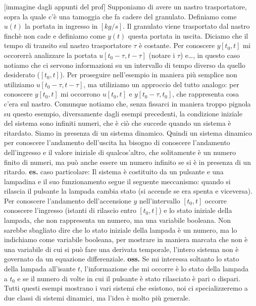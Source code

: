 [immagine dagli appunti del prof]\newline
Supponiamo di avere un nastro trasportatore, sopra la quale c'è una tamoggia che fa cadere del granulato. Definiamo come $u(t)$ la portata in ingresso in $[kg/s]$. Il granulato viene trasportato dal nastro finchè non cade e definiamo come $y(t)$ questa portata in uscita. Diciamo che il tempo di transito sul nastro trasportatore $\tau$ è costante.\newline
Per conoscere $y[t_0,t]$ mi occorerrà analizzare la portata $u[t_0-\tau,t-\tau]$ (notare i $\tau$) e\dots, in questo caso notiamo che ci servono informazioni su un intervallo di tempo diverso da quello desiderato ($[t_0,t]$). Per proseguire nell'esempio in maniera più semplice non utiliziamo $u[t_0-\tau,t-\tau]$, ma utiliziamo un approccio del tutto analogo: per conoscere $y[t_0,t]$ mi occorrono $u[t_0,t]$ e $y[t_0-\tau,t_0]$, che rappresenta cosa c'era sul nastro. Comunque notiamo che, senza fissarci in maniera troppo pignola su questo esempio, diversamente dagli esempi precedenti, la condizione iniziale del sistema sono infiniti numeri, che è ciò che succede quando un sistema è ritardato.\newline
Siamo in presenza di un sistema dinamico.\newline
\newline
Quindi un sistema dinamico per conoscere l'andamento dell'uscita ha bisogno di conoscere l'andamento dell'ingresso e il valore iniziale di qualcos'altro, che solitamente è un numero finito di numeri, ma può anche essere un numero infinito se si è in presenza di un ritardo.\newline
\newline
\textbf{es.} caso particolare:\newline
Il sistema è costituito da un pulsante e una lampadina e il suo funzionamento segue il seguente meccanismo: quando si rilascia il pulsante la lampada cambia stato (si accende se era spenta e viceversa).\newline
Per conoscere l'andamento dell'accensione $y$ nell'intervallo $[t_0,t]$ occorre conoscere l'ingresso (istanti di rilascio entro $[t_0,t]$) e lo stato iniziale della lampada, che non rappresenta un numero, ma una variabile booleana. Non sarebbe sbagliato dire che lo stato iniziale della lampada è un numero, ma lo indichiamo come variabile booleana, per mostrare in maniera marcata che non è una variabile di cui si può fare una derivata temporale, l'intero sistema non è governato da un equazione differenziale.\newline
\textbf{oss.} Se mi interessa soltanto lo stato della lampada all'isante $t$, l'informazione che mi occorre è lo stato della lampada a $t_0$ e se il numero di volte in cui il pulsante è stato rilasciato è pari o dispari.\newline
\newline
Tutti questi esempi mostrano i vari sistemi che esistono, noi ci specializzeremo a due classi di sistemi dinamici, ma l'idea è molto più generale.
